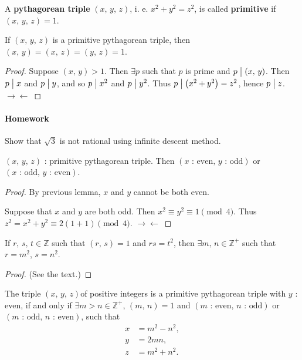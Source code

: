 \begin{definition}
    A \textbf{pythagorean triple} $\left(x,\,y,\,z\right)$, i. e. $x^2+y^2=z^2$, is
    called \textbf{primitive} if $\left(x,\,y,\,z\right)=1$.
\end{definition}

\begin{lemma}
    If $\left(x,\,y,\,z\right)$ is a primitive pythagorean triple,
    then $\left(x,\,y\right)=\left(x,\,z\right)=\left(y,\,z\right)=1$.
\end{lemma}

\begin{proof}
    Suppose $\left(x,\,y\right) >1$. Then $\exists p$ such that $p$ is prime and $p \bigm| \left(x,\,y\right)$.
    Then $p\bigm| x$ and $p \bigm| y$, and so $p \bigm| x^2$ and $p \bigm| y^2$.
    Thus $p \bigm| \left(x^2+y^2\right) = z^2$, hence $p \bigm| z$. $\rightarrow\leftarrow$
\end{proof}

\paragraph{Homework} Show that $\sqrt{3}$ is not rational using infinite descent method.

\begin{lemma}
    $\left(x,\,y,\,z\right)$ : primitive pythagorean triple. Then
    $\left(x\mbox{ : even},\, y\mbox{ : odd}\right)$ or
    $\left(x\mbox{ : odd},\, y\mbox{ : even}\right)$.
\end{lemma}

\begin{proof}
    By previous lemma, $x$ and $y$ cannot be both even.

    Suppose that $x$ and $y$ are both odd. Then $x^2 \equiv y^2 \equiv 1 \pmod{4}$.
    Thus $z^2=x^2+y^2 \equiv 2\left(1+1\right) \pmod{4}$. $\rightarrow\leftarrow$
\end{proof}

\begin{lemma}
    If $r,\,s,\,t \in \mathbb{Z}$ such that $\left(r,\,s\right)=1$ and $rs=t^2$, then
    $\exists m,\,n \in \mathbb{Z}^+$ such that $r=m^2$, $s=n^2$.
\end{lemma}

\begin{proof}
    (See the text.)
\end{proof}

\begin{theorem}
    The triple $\left(x,\,y,\,z\right)$of positive integers is a primitive pythagorean
    triple with $y$ : even, if and only if $\exists m>n \in \mathbb{Z}^+$, $\left(m,\,n\right)=1$
    and $\left(m\mbox{ : even},\, n\mbox{ : odd}\right)$ or
    $\left(m\mbox{ : odd},\, n\mbox{ : even}\right)$, such that
    \begin{align*}
        x&=m^2-n^2, \\
        y&=2mn, \\
        z&=m^2+n^2.
    \end{align*}
\end{theorem}

